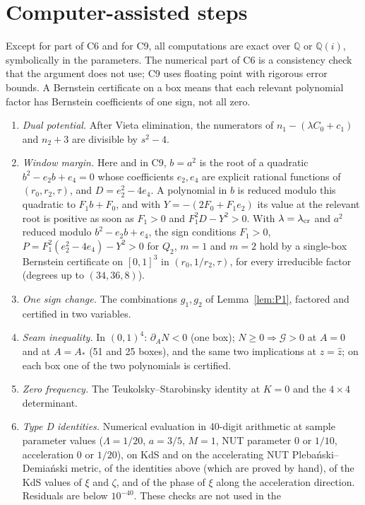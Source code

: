 \documentclass[11pt]{amsart}
\theoremstyle{definition}
\theoremstyle{remark}
\numberwithin{equation}{section}
\begin{document}
\section{Computer-assisted steps}\label{app:cert}\sloppy
Except for part of C6 and for C9, all computations are exact over $\mathbb Q$ or $\mathbb Q(i)$, symbolically in
the parameters. The numerical part of C6 is a consistency check that the argument does not use; C9 uses floating
point with rigorous error bounds. A Bernstein certificate on a box means
that each relevant polynomial factor has Bernstein coefficients of one sign, not all zero.
\begin{enumerate}[label=C\arabic*.,leftmargin=*]
\item \emph{Dual potential.} After Vieta elimination, the numerators of $n_1-(\lambda C_0+c_1)$ and $n_2+3$ are
divisible by $s^2-4$.
\item \emph{Window margin.} Here and in C9, $b=a^2$ is the root of a quadratic $b^2-e_2b+e_4=0$ whose
coefficients $e_2,e_4$ are explicit rational functions of $(r_0,r_2,\tau)$, and $D=e_2^2-4e_4$. A polynomial in $b$ is
reduced modulo this quadratic to $F_1b+F_0$, and with $Y=-(2F_0+F_1e_2)$ its value at the relevant root is positive
as soon as $F_1>0$ and $F_1^2D-Y^2>0$. With $\lambda=\lambda_{\rm cr}$ and $a^2$ reduced modulo $b^2-e_2b+e_4$, the sign
conditions $F_1>0$, $P=F_1^2(e_2^2-4e_4)-Y^2>0$ for $Q_2$, $m=1$ and $m=2$ hold by a single-box Bernstein certificate
on $[0,1]^3$ in $(r_0,1/r_2,\tau)$, for every irreducible factor (degrees up to $(34,36,8)$).
\item \emph{One sign change.} The combinations $g_1,g_2$ of Lemma~\ref{lem:P1}, factored and certified in two
variables.
\item \emph{Seam inequality.} In $(0,1)^4$: $\partial_AN<0$ (one box); $N\ge0\Rightarrow \mathcal G>0$ at $A=0$ and at $A=A_*$
(51 and 25 boxes), and the same two implications at $z=\hat z$; on each box one of the two polynomials is certified.
\item \emph{Zero frequency.} The Teukolsky--Starobinsky identity at $K=0$ and the $4\times4$ determinant.
\item \emph{Type D identities.} Numerical evaluation in 40-digit arithmetic at sample parameter values ($\Lambda=1/20$,
$a=3/5$, $M=1$, NUT parameter $0$ or $1/10$, acceleration $0$ or $1/20$), on KdS and on the accelerating NUT
Pleba\'nski--Demia\'nski metric, of the identities above (which are proved by hand), of the KdS values of $\xi$ and
$\zeta$, and of the phase of $\xi$ along the acceleration direction. Residuals are below $10^{-40}$. These checks are not used in the

\end{enumerate}
\end{document}
